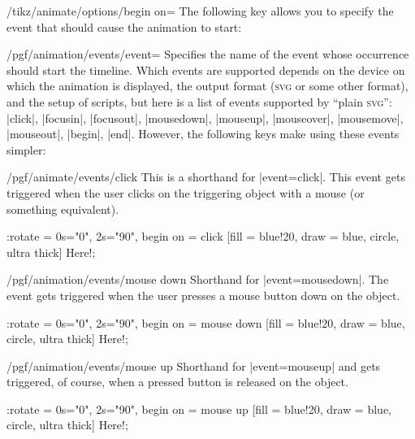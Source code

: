 \begin{key}{/tikz/animate/options/begin on=}
    The following key allows you to specify the event that should cause the
    animation to start:
    \begin{key}{/pgf/animation/events/event=}
        Specifies the name of the event whose occurrence should start the
        timeline. Which events are supported depends on the device on which the
        animation is displayed, the output format (\textsc{svg} or some other
        format), and the setup of scripts, but here is a list of events
        supported by ``plain \textsc{svg}'': |click|, |focusin|, |focusout|,
        |mousedown|,  |mouseup|, |mouseover|, |mousemove|, |mouseout|, |begin|,
        |end|. However, the following keys make using these events simpler:
        \begin{key}{/pgf/animate/events/click}
            This is a shorthand for |event=click|. This event gets triggered
            when the user clicks on the triggering object with a mouse (or
            something equivalent).
\begin{codeexample}[imagesource={standalone/pgfmanual-en-tikz-animations-animation-60.svg}]
\tikz \node :rotate = { 0s="0", 2s="90", begin on = {click}}
  [fill = blue!20, draw = blue, circle, ultra thick] {Here!};
\end{codeexample}
        \end{key}
        \begin{key}{/pgf/animation/events/mouse down}
            Shorthand for |event=mousedown|. The event gets triggered when the
            user presses a mouse button down on the object.
\begin{codeexample}[imagesource={standalone/pgfmanual-en-tikz-animations-animation-61.svg}]
\tikz \node :rotate = { 0s="0", 2s="90", begin on = {mouse down}}
  [fill = blue!20, draw = blue, circle, ultra thick] {Here!};
\end{codeexample}
        \end{key}
        \begin{key}{/pgf/animation/events/mouse up}
            Shorthand for |event=mouseup| and gets triggered, of course, when a
            pressed button is released on the object.
\begin{codeexample}[imagesource={standalone/pgfmanual-en-tikz-animations-animation-62.svg}]
\tikz \node :rotate = { 0s="0", 2s="90", begin on = {mouse up} }
  [fill = blue!20, draw = blue, circle, ultra thick] {Here!};
\end{codeexample}

\end{key}
\end{key}
\end{key}
